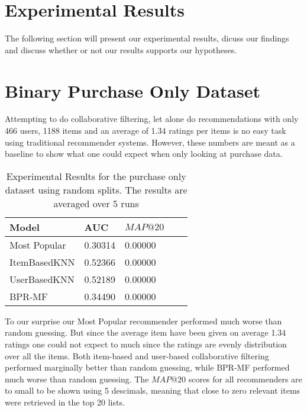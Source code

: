 
\section{Experimental Results}
\label{sec:results}

The following section will present our experimental results, dicuss our findings and
discuss whether or not our results supports our hypotheses.

\section{Binary Purchase Only Dataset}

Attempting to do collaborative filtering, let alone do recommendations with only 466 users, 1188 items and
an average of 1.34 ratings per items is no easy task using traditional recommender systems. However, these numbers
are meant as a baseline to show what one could expect when only looking at purchase data.

\begin{table}[H]
    \centering
    \begin{tabular}{*{5}l}
    \toprule
    Model 			&	AUC			&	$MAP@20$ \\ \midrule
    \rowcolor{Gray}
    Most Popular	&	0.30314		&	0.00000	\\
    ItemBasedKNN	&	0.52366		&	0.00000	\\
    UserBasedKNN	&	0.52189		&	0.00000	\\
    BPR-MF			&	0.34490		&	0.00000	\\
    \bottomrule
    \end{tabular}
\caption[Experimental Results - Purchase Only Dataset]{Experimental Results for the purchase only dataset using random splits. The results are averaged over 5 runs}
\end{table}

To our surprise our Most Popular recommender performed much worse than random guessing. But since the average item
have been given on average 1.34 ratings one could not expect to much since the ratings are evenly distribution over
all the items. Both item-based and user-based collaborative filtering performed marginally better than random guessing,
while BPR-MF performed much worse than random guessing. The $MAP@20$ scores for all recommenders are to small to be shown
using 5 descimals, meaning that close to zero relevant items were retrieved in the top 20 lists.

